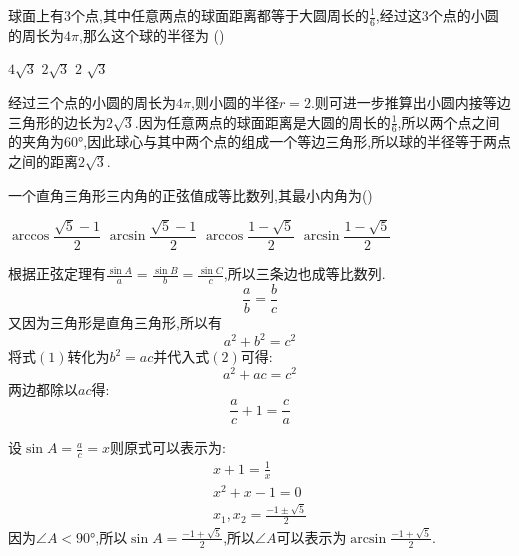 \begin{questions}
	\question
	球面上有$3$个点,其中任意两点的球面距离都等于大圆周长的$\frac16$,经过这$3$个点的小圆的周长为$4\pi$,那么这个球的半径为
	\hfill (\hspace{1cm})

	\begin{oneparchoices}
		\choice $4\sqrt{3}$
		\CorrectChoice $2\sqrt{3}$
		\choice $2$
		\choice $\sqrt{3}$
	\end{oneparchoices}

	\begin{solution}
		经过三个点的小圆的周长为$4\pi$,则小圆的半径$r=2$.则可进一步推算出小圆内接等边三角形的边长为$2\sqrt{3}$.因为任意两点的球面距离是大圆的周长的$\frac16$,所以两个点之间的夹角为$\ang{60}$,因此球心与其中两个点的组成一个等边三角形,所以球的半径等于两点之间的距离$2\sqrt{3}$.
	\end{solution}

	\question 一个直角三角形三内角的正弦值成等比数列,其最小内角为\hfill (\hspace{1cm})

	\begin{oneparchoices}
		\choice $\arccos\dfrac{\sqrt{5}-1}{2}$
		\CorrectChoice $\arcsin\dfrac{\sqrt{5}-1}{2}$
		\choice $\arccos\dfrac{1-\sqrt{5}}{2}$
		\choice $\arcsin\dfrac{1-\sqrt{5}}{2}$
	\end{oneparchoices}

	\begin{solution}
		根据正弦定理有$\frac{\sin A}{a}=\frac{\sin B}{b}=\frac{\sin C}{c}$,所以三条边也成等比数列.
		\begin{equation*}
			\frac{a}{b} = \frac{b}{c} \tag{1}
		\end{equation*}
		又因为三角形是直角三角形,所以有
		\begin{equation*}
			a^2 + b^2 = c^2 \tag{2}
		\end{equation*}
		将式$(1)$转化为$b^2=ac$并代入式$(2)$可得:
		\begin{equation*}
			a^2 + ac = c^2
		\end{equation*}
		两边都除以$ac$得:
		\begin{equation*}
			\frac{a}{c} + 1 = \frac{c}{a}
		\end{equation*}

		设$\sin{A}=\frac{a}{c}=x$则原式可以表示为:
		\begin{align*}
			x + 1 = \frac{1}{x} \\
			x^2 + x - 1 = 0     \\
			x_1,x_2 = \frac{-1\pm\sqrt{5}}{2}
		\end{align*}
		因为$\angle{A}<\ang{90}$,所以$\sin{A}=\frac{-1+\sqrt{5}}{2}$,所以$\angle{A}$可以表示为$\arcsin{\frac{-1+\sqrt{5}}{2}}$.
	\end{solution}


\end{questions}
